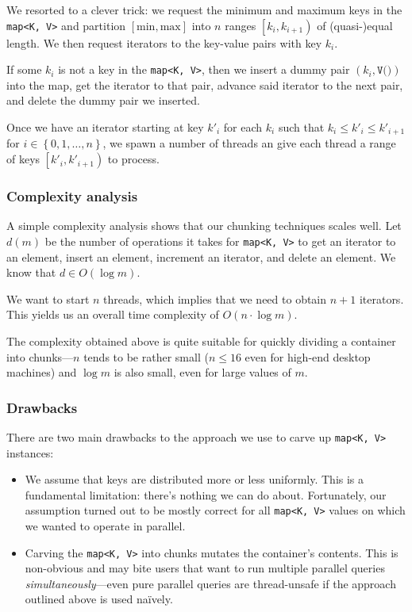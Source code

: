 \documentclass[a4paper,12pt]{article}
\newcommand{\shorttypename}[1]{\texttt{#1}}
\newcommand{\typename}[2]{\texttt{#2}} %
\begin{document}
We resorted to a clever trick: we request the minimum and maximum keys in the \typename{std}{map<K, V>} and partition $\left[\text{min}, \text{max}\right]$ into $n$ ranges $\left[k_i, k_{i+1}\right)$ of (quasi-)equal length. We then request iterators to the key-value pairs with key $k_i$.

If some $k_i$ is not a key in the \typename{std}{map<K, V>}, then we insert a dummy pair $\left(k_i, \shorttypename{V()}\right)$ into the map, get the iterator to that pair, advance said iterator to the next pair, and delete the dummy pair we inserted.

Once we have an iterator starting at key $k'_i$ for each $k_i$ such that $k_i \le k'_i \le k'_{i+1}$ for $i \in \left\{0, 1, \dots, n\right\}$, we spawn a number of threads an give each thread a range of keys $\left[k'_i, k'_{i+1}\right)$ to process.

\subsubsection{Complexity analysis}

A simple complexity analysis shows that our chunking techniques scales well. Let $d\left(m\right)$ be the number of operations it takes for \typename{std}{map<K, V>} to get an iterator to an element, insert an element, increment an iterator, and delete an element. We know that $d \in O\left(\log m\right)$.

We want to start $n$ threads, which implies that we need to obtain $n + 1$ iterators. This yields us an overall time complexity of $O\left(n \cdot \log m\right)$.

The complexity obtained above is quite suitable for quickly dividing a container into chunks---$n$ tends to be rather small ($n \le 16$ even for high-end desktop machines) and $\log m$ is also small, even for large values of $m$.

\subsubsection{Drawbacks}

There are two main drawbacks to the approach we use to carve up \typename{std}{map<K, V>} instances:

\begin{itemize}
	\item We assume that keys are distributed more or less uniformly. This is a fundamental limitation: there's nothing we can do about. Fortunately, our assumption turned out to be mostly correct for all \typename{std}{map<K, V>} values on which we wanted to operate in parallel.
	
	\item Carving the \typename{std}{map<K, V>} into chunks mutates the container's contents. This is non-obvious and may bite users that want to run multiple parallel queries \emph{simultaneously}---even pure parallel queries are thread-unsafe if the approach outlined above is used na\"ively.
\end{itemize}
\end{document}
